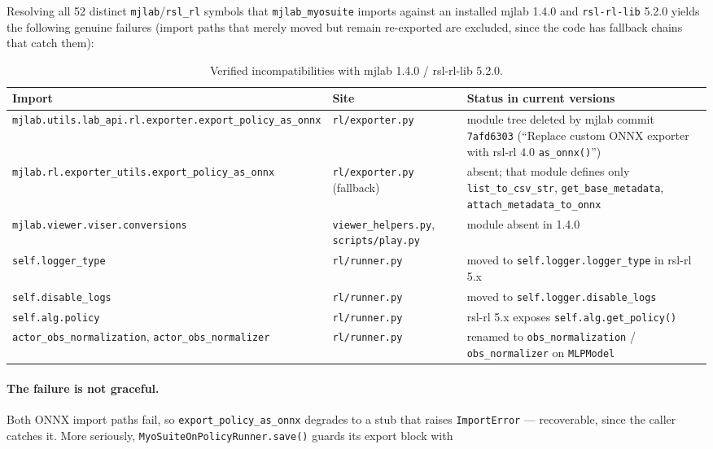 \documentclass[11pt,a4paper]{article}
\begin{document}
\noindent
Resolving all 52 distinct \texttt{mjlab}/\texttt{rsl\_rl} symbols that
\texttt{mjlab\_myosuite} imports against an installed mjlab 1.4.0 and
\texttt{rsl-rl-lib} 5.2.0 yields the following genuine failures (import paths that merely
moved but remain re-exported are excluded, since the code has fallback chains that catch
them):

\begin{table}[h!]
\centering
\footnotesize
\begin{tabular}{@{}L{5.4cm}L{3.0cm}L{4.4cm}@{}}
\toprule
Import & Site & Status in current versions \\
\midrule
\texttt{mjlab.utils.lab\_api.rl.exporter\allowbreak.export\_policy\_as\_onnx}
  & \texttt{rl/exporter.py}
  & module tree deleted by mjlab commit \texttt{7afd6303} (``Replace custom ONNX exporter with rsl-rl 4.0 \texttt{as\_onnx()}'') \\
\texttt{mjlab.rl.exporter\_utils\allowbreak.export\_policy\_as\_onnx}
  & \texttt{rl/exporter.py} (fallback)
  & absent; that module defines only \texttt{list\_to\_csv\_str}, \texttt{get\_base\_metadata}, \texttt{attach\_metadata\_to\_onnx} \\
\texttt{mjlab.viewer.viser.conversions}
  & \texttt{viewer\_helpers.py}, \texttt{scripts/play.py}
  & module absent in 1.4.0 \\
\texttt{self.logger\_type}
  & \texttt{rl/runner.py}
  & moved to \texttt{self.logger.logger\_type} in rsl-rl 5.x \\
\texttt{self.disable\_logs}
  & \texttt{rl/runner.py}
  & moved to \texttt{self.logger.disable\_logs} \\
\texttt{self.alg.policy}
  & \texttt{rl/runner.py}
  & rsl-rl 5.x exposes \texttt{self.alg.get\_policy()} \\
\texttt{actor\_obs\_normalization}, \texttt{actor\_obs\_normalizer}
  & \texttt{rl/runner.py}
  & renamed to \texttt{obs\_normalization} / \texttt{obs\_normalizer} on \texttt{MLPModel} \\
\bottomrule
\end{tabular}
\caption{Verified incompatibilities with mjlab 1.4.0 / rsl-rl-lib 5.2.0.}
\end{table}

\paragraph{The failure is not graceful.} Both ONNX import paths fail, so
\texttt{export\_policy\_as\_onnx} degrades to a stub that raises \texttt{ImportError} ---
recoverable, since the caller catches it. More seriously,
\texttt{MyoSuiteOnPolicyRunner.save()} guards its export block with
\end{document}
